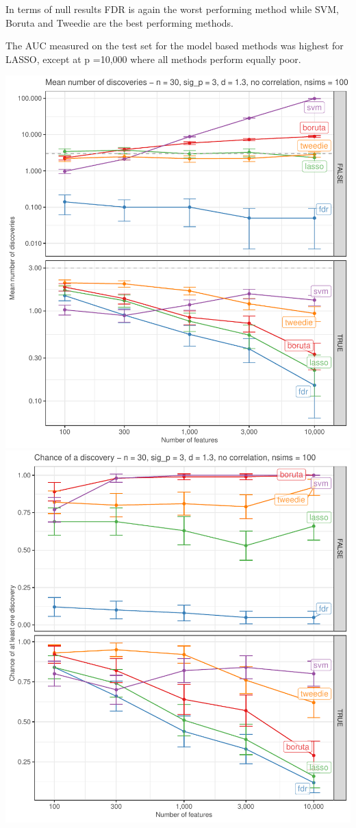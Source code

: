 \documentclass[
]{article}
\begin{document}
In terms of null results FDR is again the worst performing method while SVM, Boruta and Tweedie are the best performing methods.

The AUC measured on the test set for the model based methods was highest for LASSO, except at p =10,000 where all methods perform equally poor.

\begin{center}\includegraphics[width=0.49\linewidth]{main_files/figure-latex/unnamed-chunk-46-1} \includegraphics[width=0.49\linewidth]{main_files/figure-latex/unnamed-chunk-46-2} \end{center}
\end{document}
